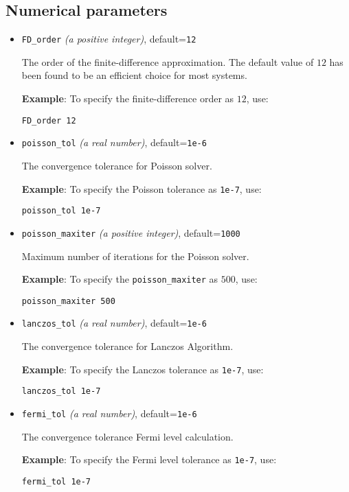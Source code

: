 \documentclass[12pt]{report}
\begin{document}

\subsection{Numerical parameters}
\begin{itemize}

\item\texttt{FD\_order} {\it{(a positive integer)}}, default=\texttt{12}

The order of the finite-difference approximation. The default value of $12$ has been found to be an efficient choice for most systems. 

{\bf{Example}}: To specify the finite-difference order as $12$, use: 

\texttt{FD\_order 12}

\item\texttt{poisson\_tol} {\it{(a real number)}}, default=\texttt{1e-6}

The convergence tolerance for Poisson solver.
 
{\bf{Example}}: To specify the Poisson tolerance as \texttt{1e-7}, use: 

\texttt{poisson\_tol 1e-7}

\item\texttt{poisson\_maxiter} {\it{(a positive integer)}}, default=\texttt{1000}

Maximum number of iterations for the Poisson solver. 

{\bf{Example}}: To specify the \texttt{poisson\_maxiter} as $500$, use: 

\texttt{poisson\_maxiter 500}

\item\texttt{lanczos\_tol} {\it{(a real number)}}, default=\texttt{1e-6}

The convergence tolerance for Lanczos Algorithm. 

{\bf{Example}}: To specify the Lanczos tolerance as \texttt{1e-7}, use: 

\texttt{lanczos\_tol 1e-7}

\item\texttt{fermi\_tol} {\it{(a real number)}}, default=\texttt{1e-6}

The convergence tolerance Fermi level calculation.
 
{\bf{Example}}: To specify the Fermi level tolerance as \texttt{1e-7}, use: 

\texttt{fermi\_tol 1e-7}


\end{itemize}
\end{document}
